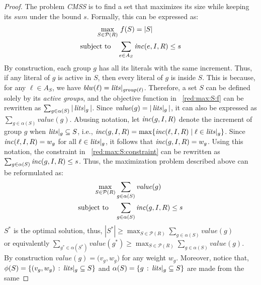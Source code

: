 \begin{proof}
    The problem \textit{CMSS} is to find a set that maximizes 
    its size while keeping its $\mathit{sum}$
    under the bound $s$. Formally, this can be expressed as:
    \begin{align}
        \label{red:max:S:f}
        \max_{S \in \mathcal{P}(R)} & \ f(S)=|S| \\
        \label{red:max:S:constraint}
        \text{subject to} \quad & \sum_{e \in A_S} \mathit{inc}(e,I,R) \le s 
    \end{align}
    By construction, each group $g$ has all its literals with the same increment. 
    Thus, if any literal of $g$ is active in $S$, then every literal of $g$ is 
    inside $S$. This is because, for any $\ell \in A_S$, we have $\mathit{blw}(\ell) = \mathit{lits}|_{\mathit{group}(\ell)}$.
    Therefore, a set $S$ can be defined solely by its \textit{active groups}, 
    and the objective function in ~\ref{red:max:S:f} can be rewritten 
    as $\sum_{g \in \alpha(S)} |\,\mathit{lits}|_g\,|$. Since $\mathit{value}(g) = |\,\mathit{lits}|_g\,|$, 
    it can also be expressed as $\sum_{g \in \alpha(S)} \mathit{value}(g)$.
    Abusing notation, let $\mathit{inc}(g, I, R)$ denote the increment of group $g$ when 
    $\mathit{lits}|_g \subseteq S$, 
    i.e., $\mathit{inc}(g, I, R) = \max\{\mathit{inc}(\ell, I, R) \mid \ell \in \mathit{lits}|_g\}$.
    Since $\mathit{inc}(\ell, I, R) = w_g$ for all $\ell \in \mathit{lits}|_g$, it follows that $\mathit{inc}(g, I, R) = w_g$.
    Using this notation, the constraint in ~\ref{red:max:S:constraint} can be rewritten as 
    $\sum_{g \in \alpha(S)} \mathit{inc}(g, I, R) \leq s$.
    Thus, the maximization problem described above can be reformulated as:
    \begin{align}
        \label{red:max:S:f:G}
        \max_{S \in \mathcal{P}(R)} & \sum_{g \in \alpha(S)} \mathit{value}(g) \\
        \label{red:max:S:constraint:G}
        \text{subject to} \quad & \sum_{g \in \alpha(S)} \mathit{inc}(g,I,R) \le s 
    \end{align}
    $S^*$ is the optimal solution, thus,
    $|S^*| \ge \max_{S \in \mathcal{P}(R)} \sum_{g \in \alpha(S)} \mathit{value}(g)$\\
    or equivalently 
    $\sum_{g^* \in \alpha(S^*)} \mathit{value}(g^*) 
    \ge \max_{S \in \mathcal{P}(R)} \sum_{g \in \alpha(S)} \mathit{value}(g)$.\\
    By construction $\mathit{value}(g) = \mathit(v_g, w_g)$ for any weight $w_g$.
    Moreover, notice that, $\phi(S) = \{(v_g, w_g) \,:\, \mathit{lits}|_g \subseteq S\}$
    and $\alpha(S) = \{g \,:\, \mathit{lits}|_g \subseteq S\}$ are made from the same 

\end{proof}
